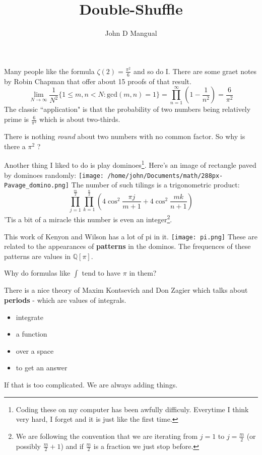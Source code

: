 \documentclass[12pt]{article}
\title{\textbf{ Double-Shuffle }}
\author{John D Mangual}
\date{}
\begin{document}
\selectfont \fontsize{25}{30}\selectfont

\maketitle

\noindent Many people like the formula $\zeta(2) = \frac{\pi^2}{6}$ and so do I.  There are some graet notes by Robin Chapman that offer about 15 proofs of that result.
$$ \lim_{N \to \infty} \frac{1}{N^2}
\bigg\{ 1 \leq m, n < N : \mathrm{gcd}(m,n)=1
\bigg\} = \prod_{n = 1}^\infty \left( 1 - \frac{1}{n^2} \right) = \frac{6}{\pi^2}  $$
The classic ``application" is that the probability of two numbers being relatively prime is $\frac{6}{\pi^2}$ which is about two-thirds.  \newline 

\noindent There is nothing \textit{round} about two numbers with no common factor.  So why is there a $\pi^2$ ?
\newpage


\noindent Another thing I liked to do is play dominoes\footnote{Coding these on my computer has been awfully difficuly.  Everytime I think very hard, I forget and it is just like the first time.}.  Here's an image of rectangle paved by dominoes randomly:\newline
\texttt{[image: /home/john/Documents/math/288px-Pavage\_domino.png]} \newline
The number of such tilings is a trigonometric product:
$$ \prod_{j=1}^{\frac{m}{2}} \prod_{k=1}^{\frac{n}{2}} \left( 4 \cos^2 \frac{\pi j}{m+1} + 
4 \cos^2 \frac{mk}{n+1}\right) $$
'Tis a bit of a miracle this number is even an integer\footnote{We are following the convention that we are iterating from $j = 1$ to $j = \frac{m}{2}$ (or possibly $\frac{m}{2} + 1$) and if $\frac{m}{2}$ is a fraction we just stop before.}.  
\newpage

This work of Kenyon and Wilson has a lot of pi in it.\newline
\texttt{[image: pi.png]} \newline
These are related to the appearances of \textbf{patterns}  in the dominos.  The frequences of these patterns are values in $\mathbb{Q}[\pi]$.
\newpage

\noindent Why do formulas like $\int$ tend to have $\pi$ in them? \newline

\noindent There is a nice theory of Maxim Kontsevich and Don Zagier which talks about \textbf{periods} - which are values of integrals.  
\begin{itemize}
\item integrate
\item a function
\item over a space
\item to get an answer
\end{itemize}
If that is too complicated.  We are always adding things.  \newline
\end{document}
